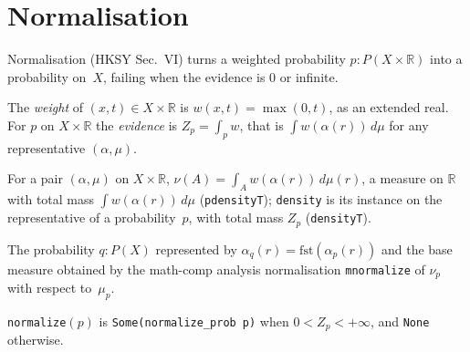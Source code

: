 \section{Normalisation}\label{sec:general_normalizer}

Normalisation (HKSY Sec.~VI) turns a weighted probability
$p : P(X \times \mathbb{R})$ into a probability on~$X$, failing when the
evidence is $0$ or infinite.

\begin{definition}\label{def:evidence}
  \rocqok
  The \emph{weight} of $(x, t) \in X \times \mathbb{R}$ is
  $w(x, t) = \max(0, t)$, as an extended real. For $p$ on
  $X \times \mathbb{R}$ the \emph{evidence} is $Z_p = \int_p w$, that is
  $\int w(\alpha(r))\, d\mu$ for any representative $(\alpha, \mu)$.
\end{definition}

\begin{definition}\label{def:density}
  \rocqok
  For a pair $(\alpha, \mu)$ on $X \times \mathbb{R}$,
  $\nu(A) = \int_A w(\alpha(r))\, d\mu(r)$, a measure on $\mathbb{R}$ with
  total mass $\int w(\alpha(r))\, d\mu$ (\texttt{pdensityT});
  \texttt{density} is its instance on the representative of a
  probability~$p$, with total mass $Z_p$ (\texttt{densityT}).
\end{definition}

\begin{definition}\label{def:normalize_prob}
  \rocqok
  The probability $q : P(X)$ represented by $\alpha_q(r) = \mathrm{fst}(\alpha_p(r))$
  and the base measure obtained by the math-comp analysis normalisation
  \texttt{mnormalize} of $\nu_p$ with respect to~$\mu_p$.
\end{definition}

\begin{definition}\label{def:normalize}
  \rocqok
  \texttt{normalize}$(p)$ is \texttt{Some(normalize\_prob p)}
  when $0 < Z_p < +\infty$, and \texttt{None} otherwise.
\end{definition}

